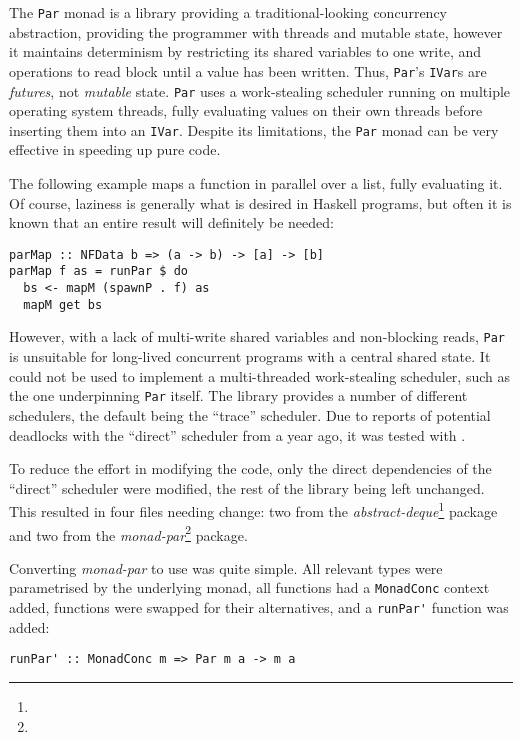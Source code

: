 The \verb|Par| monad \citep{parmonad} is a library providing a
traditional-looking concurrency abstraction, providing the programmer
with threads and mutable state, however it maintains determinism by
restricting its shared variables to one write, and operations to read
block until a value has been written. Thus, \verb|Par|'s \verb|IVar|s
are \emph{futures}, not \emph{mutable} state. \verb|Par| uses a
work-stealing scheduler running on multiple operating system threads,
fully evaluating values on their own threads before inserting them
into an \verb|IVar|. Despite its limitations, the \verb|Par| monad can
be very effective in speeding up pure code.

The following example maps a function in parallel over a list, fully
evaluating it. Of course, laziness is generally what is desired in
Haskell programs, but often it is known that an entire result will
definitely be needed:

\begin{verbatim}
parMap :: NFData b => (a -> b) -> [a] -> [b]
parMap f as = runPar $ do
  bs <- mapM (spawnP . f) as
  mapM get bs
\end{verbatim}

However, with a lack of multi-write shared variables and non-blocking
reads, \verb|Par| is unsuitable for long-lived concurrent programs
with a central shared state. It could not be used to implement a
multi-threaded work-stealing scheduler, such as the one underpinning
\verb|Par| itself. The library provides a number of different
schedulers, the default being the ``trace'' scheduler. Due to reports
of potential deadlocks with the ``direct'' scheduler from a year ago,
it was tested with \dejafu{}.


To reduce the effort in modifying the code, only the direct
dependencies of the ``direct'' scheduler were modified, the rest of
the library being left unchanged. This resulted in four files needing
change: two from the
\emph{abstract-deque}\footnote{} package and
two from the \emph{monad-par}\footnote{} package.

Converting \emph{monad-par} to use \dejafu{} was quite simple. All
relevant types were parametrised by the underlying monad, all
functions had a \verb|MonadConc| context added, functions were swapped
for their \dejafu{} alternatives, and a \verb|runPar'| function was
added:

\begin{verbatim}
runPar' :: MonadConc m => Par m a -> m a
\end{verbatim}

